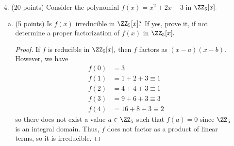 \documentclass{article}
\begin{document}
\begin{itemize}
\begin{enumerate}[(a)]
			\item (5 points) Is $I$ a prime ideal? Prove or disprove it.
				\begin{proof}
					Since $A$ is a commutative ring, $I$ being a prime ideal is equivalent to $A/I$ being an integral domain. Let $f+I, g+I\in A/I$ where $f, g\in A.$ Then the product is
					\[(f+I)(g+I)=fg+I\]
					If this product is equal to 0 coset, then it is equal to $I.$ Thus, $fg\in I,$ so,
					\[(fg)(1/2) = f(1/2)\cdot g(1/2) = 0\]
					Since $f(1/2), g(1/2)\in \RR$ it must be that either $f(1/2)=0$ or $g(1/2)=0.$ Thus, $f\in I$ or $g\in I,$ which means either $f+I=I$ or $g+I=I,$ so $A/I$ is an integral domain. Thus, $I$ is indeed a prime ideal.
				\end{proof}

			\item (10 points) Is $I$ a maximal ideal? Prove or disprove it.
				\begin{proof}
					Since $A$ is a commutative ring, $I$ being a maximal ideal is equivalent to $A/I$ being a field. We already know that $A/I$ is a ring, so we must show that every element has an inverse. Let $f+I, g+I\in A/I$ be inverses of each other, where $f, g\in A.$ Then 
					\[(f+I)(g+I)=fg+I=1+I\implies fg-1\in I\]
					Thus,
					\begin{align*}
						(fg)(1/2)-1=f(1/2)\cdot g(1/2)-1 = 0&\implies f(1/2)\cdot g(1/2)=1 \\
						&\implies f(1/2) = \frac{1}{g(1/2)}
					\end{align*}
					If we let $g=1/f\in A$ then it follows that \[(f+I)\left(\frac{1}{f}+I\right) = 1+I\] so every coset in $A/I$ has an inverse. Thus, $A/I$ is a field, so $I$ is indeed a maximal ideal.
				\end{proof}
				
		\end{enumerate}

		\newpage

	\item[4.] (20 points) Consider the polynomial $f(x)=x^2+2x+3$ in $\ZZ_5[x].$
		\begin{enumerate}[(a)]
			\item (5 points) Is $f(x)$ irreducible in $\ZZ_5[x]?$ If yes, prove it, if not determine a proper factorization of $f(x)$ in $\ZZ_5[x].$
				\begin{proof}
					If $f$ is reducible in $\ZZ_5[x],$ then $f$ factors as $(x-a)(x-b).$ However, we have
					\begin{align*}
						f(0) &= 3 \\
						f(1) &= 1+2+3\equiv 1 \\
						f(2) &= 4+4+3\equiv 1 \\
						f(3) &= 9+6+3\equiv3 \\
						f(4) &= 16+8+3\equiv 2
					\end{align*}
					so there does not exist a value $a\in \ZZ_5$ such that $f(a)=0$ since $\ZZ_5$ is an integral domain. Thus, $f$ does not factor as a product of linear terms, so it is irreducible.
				\end{proof}


\end{enumerate}
\end{itemize}
\end{document}
